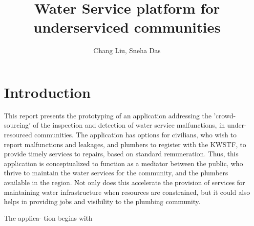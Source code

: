 \documentclass{article}
\title{Water Service platform for underserviced communities}
\author{Chang Liu, Sneha Das}
\begin{document}
\maketitle

\section{Introduction}
This report presents the prototyping of an application addressing the ’crowd-
sourcing’ of the inspection and detection of water service malfunctions, in under-
resourced communities. The application has options for civilians, who wish to
report malfunctions and leakages, and plumbers to register with the KWSTF,
to provide timely services to repairs, based on standard remuneration. Thus,
this application is conceptualized to function as a mediator between the public,
who thrive to maintain the water services for the community, and the plumbers
available in the region. Not only does this accelerate the provision of services
for maintaining water infrastructure when resources are constrained, but it could also
helps in providing jobs and visibility to the plumbing community.

The applica-
tion begins with \lipsum[2]
\end{document}
